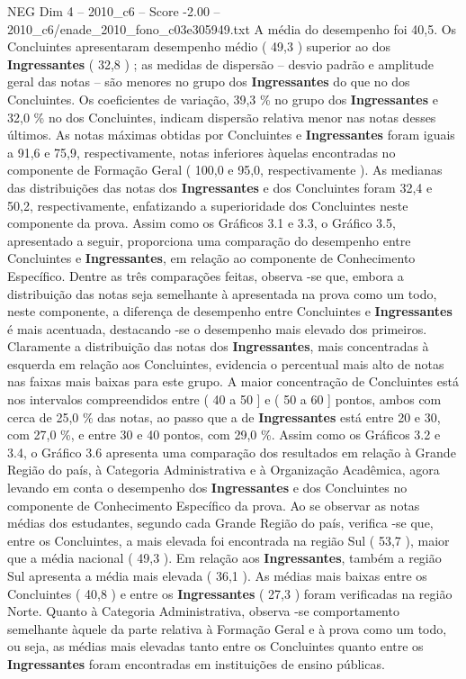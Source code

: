 \begin{textsample}{NEG Dim 4 – 2010\_c6 – Score -2.00 – 2010\_c6/enade\_2010\_fono\_c03e305949.txt}
A média do desempenho foi 40,5.
Os Concluintes apresentaram desempenho médio ( 49,3 ) superior ao dos \textbf{Ingressantes} ( 32,8 ) ; as medidas de dispersão – desvio padrão e amplitude geral das notas – são menores no grupo dos \textbf{Ingressantes} do que no dos Concluintes.
Os coeficientes de variação, 39,3 \% no grupo dos \textbf{Ingressantes} e 32,0 \% no dos Concluintes, indicam dispersão relativa menor nas notas desses últimos.
As notas máximas obtidas por Concluintes e \textbf{Ingressantes} foram iguais a 91,6 e 75,9, respectivamente, notas inferiores àquelas encontradas no componente de Formação Geral ( 100,0 e 95,0, respectivamente ).
As medianas das distribuições das notas dos \textbf{Ingressantes} e dos Concluintes foram 32,4 e 50,2, respectivamente, enfatizando a superioridade dos Concluintes neste componente da prova.
Assim como os Gráficos 3.1 e 3.3, o Gráfico 3.5, apresentado a seguir, proporciona uma comparação do desempenho entre Concluintes e \textbf{Ingressantes}, em relação ao componente de Conhecimento Específico.
Dentre as três comparações feitas, observa -se que, embora a distribuição das notas seja semelhante à apresentada na prova como um todo, neste componente, a diferença de desempenho entre Concluintes e \textbf{Ingressantes} é mais acentuada, destacando -se o desempenho mais elevado dos primeiros.
Claramente a distribuição das notas dos \textbf{Ingressantes}, mais concentradas à esquerda em relação aos Concluintes, evidencia o percentual mais alto de notas nas faixas mais baixas para este grupo.
A maior concentração de Concluintes está nos intervalos compreendidos entre ( 40 a 50 ] e ( 50 a 60 ] pontos, ambos com cerca de 25,0 \% das notas, ao passo que a de \textbf{Ingressantes} está entre 20 e 30, com 27,0 \%, e entre 30 e 40 pontos, com 29,0 \%.
Assim como os Gráficos 3.2 e 3.4, o Gráfico 3.6 apresenta uma comparação dos resultados em relação à Grande Região do país, à Categoria Administrativa e à Organização Acadêmica, agora levando em conta o desempenho dos \textbf{Ingressantes} e dos Concluintes no componente de Conhecimento Específico da prova.
Ao se observar as notas médias dos estudantes, segundo cada Grande Região do país, verifica -se que, entre os Concluintes, a mais elevada foi encontrada na região Sul ( 53,7 ), maior que a média nacional ( 49,3 ).
Em relação aos \textbf{Ingressantes}, também a região Sul apresenta a média mais elevada ( 36,1 ).
As médias mais baixas entre os Concluintes ( 40,8 ) e entre os \textbf{Ingressantes} ( 27,3 ) foram verificadas na região Norte.
Quanto à Categoria Administrativa, observa -se comportamento semelhante àquele da parte relativa à Formação Geral e à prova como um todo, ou seja, as médias mais elevadas tanto entre os Concluintes quanto entre os \textbf{Ingressantes} foram encontradas em instituições de ensino públicas.

\end{textsample}
